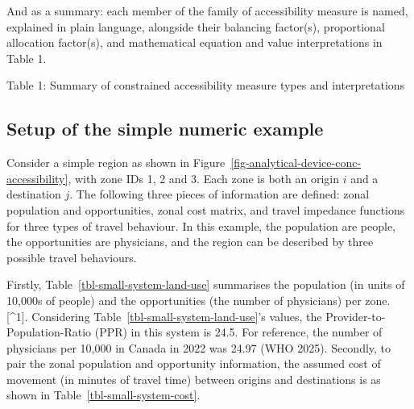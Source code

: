 \documentclass[
]{article}
\begin{document}
And as a summary: each member of the family of accessibility measure is
named, explained in plain language, alongside their balancing factor(s),
proportional allocation factor(s), and mathematical equation and value
interpretations in Table 1.



Table 1: Summary of constrained accessibility measure types and
interpretations

\subsection{Setup of the simple numeric
example}\label{setup-of-the-simple-numeric-example}

Consider a simple region as shown in
Figure~\ref{fig-analytical-device-conc-accessibility}, with zone IDs 1,
2 and 3. Each zone is both an origin \(i\) and a destination \(j\). The
following three pieces of information are defined: zonal population and
opportunities, zonal cost matrix, and travel impedance functions for
three types of travel behaviour. In this example, the population are
people, the opportunities are physicians, and the region can be
described by three possible travel behaviours.

Firstly, Table~\ref{tbl-small-system-land-use} summarises the population
(in units of 10,000s of people) and the opportunities (the number of
physicians) per zone. {[}\^{}1{]}. Considering
Table~\ref{tbl-small-system-land-use}'s values, the
Provider-to-Population-Ratio (PPR) in this system is 24.5. For
reference, the number of physicians per 10,000 in Canada in 2022 was
24.97 (WHO 2025). Secondly, to pair the zonal population and opportunity
information, the assumed cost of movement (in minutes of travel time)
between origins and destinations is as shown in
Table~\ref{tbl-small-system-cost}.
\end{document}
